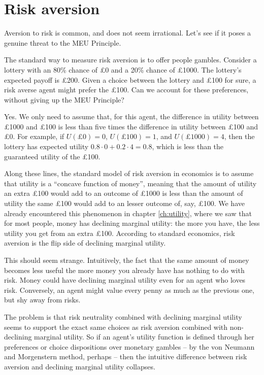 \section{Risk aversion}

Aversion to risk is common, and does not seem irrational. Let's see if
it poses a genuine threat to the MEU Principle.

The standard way to measure risk aversion is to offer people gambles.
Consider a lottery with an 80\% chance of £0 and a 20\% chance of
£1000. The lottery's expected payoff is £200. Given a choice between
the lottery and £100 for sure, a risk averse agent might prefer the
£100. Can we account for these preferences, without giving up the MEU
Principle?

Yes. We only need to assume that, for this agent, the difference in
utility between £1000 and £100 is less than five times the difference
in utility between £100 and £0. For example, if $U(\text{£0}) = 0$,
$U(\text{£100}) = 1$, and $U(\text{£1000}) = 4$, then the lottery has
expected utility $0.8 \cdot 0 + 0.2 \cdot 4 = 0.8$, which is less than
the guaranteed utility of the £100.


Along these lines, the standard model of risk aversion in economics is
to assume that utility is a ``concave function of money'', meaning
that the amount of utility an extra £100 would add to an outcome of
£1000 is less than the amount of utility the same £100 would add to an
lesser outcome of, say, £100. We have already encountered this
phenomenon in chapter \ref{ch:utility}, where we saw that for most
people, money has declining marginal utility: the more you have, the
less utility you get from an extra £100. According to standard
economics, risk aversion is the flip side of declining marginal
utility.

This should seem strange. Intuitively, the fact that the same amount of
money becomes less useful the more money you already have has nothing
to do with risk. Money could have declining marginal utility even for
an agent who loves risk. Conversely, an agent might value every penny
as much as the previous one, but shy away from risks.

The problem is that risk neutrality combined with declining marginal
utility seems to support the exact same choices as risk aversion
combined with non-declining marginal utility. So if an agent's utility
function is defined through her preferences or choice dispositions
over monetary gambles -- by the von Neumann and Morgenstern method,
perhaps -- then the intuitive difference between risk aversion and
declining marginal utility collapses.

